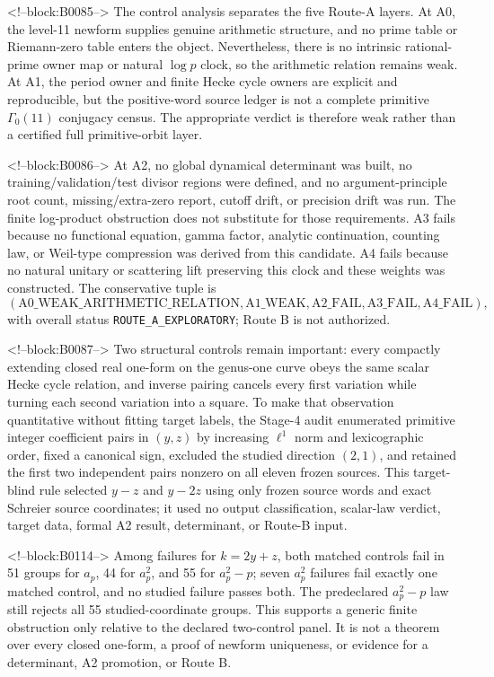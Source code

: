 \documentclass[11pt]{article}
\theoremstyle{definition}
\theoremstyle{remark}
\newcommand{\G}{\Gamma_0(11)}
\begin{document}
<!--block:B0085-->
The control analysis separates the five Route-A layers. At A0, the level-11 newform supplies genuine arithmetic structure, and no prime table or Riemann-zero table enters the object. Nevertheless, there is no intrinsic rational-prime owner map or natural $\log p$ clock, so the arithmetic relation remains weak. At A1, the period owner and finite Hecke cycle owners are explicit and reproducible, but the positive-word source ledger is not a complete primitive $\G$ conjugacy census. The appropriate verdict is therefore weak rather than a certified full primitive-orbit layer.

<!--block:B0086-->
At A2, no global dynamical determinant was built, no training/validation/test divisor regions were defined, and no argument-principle root count, missing/extra-zero report, cutoff drift, or precision drift was run. The finite log-product obstruction does not substitute for those requirements. A3 fails because no functional equation, gamma factor, analytic continuation, counting law, or Weil-type compression was derived from this candidate. A4 fails because no natural unitary or scattering lift preserving this clock and these weights was constructed. The conservative tuple is
\[
(\mathrm{A0\_WEAK\_ARITHMETIC\_RELATION},
\mathrm{A1\_WEAK},\mathrm{A2\_FAIL},\mathrm{A3\_FAIL},\mathrm{A4\_FAIL}),
\]
with overall status \texttt{ROUTE\_A\_EXPLORATORY}; Route B is not authorized.

<!--block:B0087-->
Two structural controls remain important: every compactly extending closed real one-form on the genus-one curve obeys the same scalar Hecke cycle relation, and inverse pairing cancels every first variation while turning each second variation into a square. To make that observation quantitative without fitting target labels, the Stage-4 audit enumerated primitive integer coefficient pairs in $(y,z)$ by increasing $\ell^1$ norm and lexicographic order, fixed a canonical sign, excluded the studied direction $(2,1)$, and retained the first two independent pairs nonzero on all eleven frozen sources. This target-blind rule selected $y-z$ and $y-2z$ using only frozen source words and exact Schreier source coordinates; it used no output classification, scalar-law verdict, target data, formal A2 result, determinant, or Route-B input.

<!--block:B0114-->
Among failures for $k=2y+z$, both matched controls fail in 51 groups for $a_p$, 44 for $a_p^2$, and 55 for $a_p^2-p$; seven $a_p^2$ failures fail exactly one matched control, and no studied failure passes both. The predeclared $a_p^2-p$ law still rejects all 55 studied-coordinate groups. This supports a generic finite obstruction only relative to the declared two-control panel. It is not a theorem over every closed one-form, a proof of newform uniqueness, or evidence for a determinant, A2 promotion, or Route B.
\end{document}
